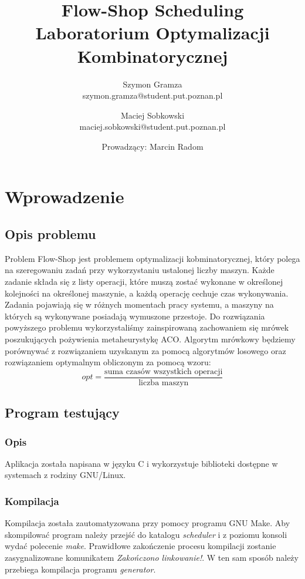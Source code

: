 \documentclass[10pt,a4paper]{article}
\title{Flow-Shop Scheduling\\Laboratorium Optymalizacji Kombinatorycznej}
\author{Szymon Gramza\\
  szymon.gramza@student.put.poznan.pl
\and
  Maciej Sobkowski\\
  maciej.sobkowski@student.put.poznan.pl
\and
  Prowadzący: Marcin Radom
}
\begin{document}
\maketitle
\section{Wprowadzenie}
\subsection{Opis problemu}
Problem Flow-Shop jest problemem optymalizacji kobminatorycznej, który polega na
szeregowaniu zadań przy wykorzystaniu ustalonej liczby maszyn. Każde zadanie
składa się z listy operacji, które muszą zostać wykonane w określonej kolejności
na określonej maszynie, a każdą operację cechuje czas wykonywania. Zadania
pojawiają się w różnych momentach pracy systemu, a maszyny na których są
wykonywane posiadają wymuszone przestoje.  Do rozwiązania powyższego problemu
wykorzystaliśmy zainspirowaną zachowaniem się mrówek poszukujących pożywienia
metaheurystykę ACO\@. Algorytm mrówkowy będziemy porównywać z rozwiązaniem
uzyskanym za pomocą algorytmów losowego oraz rozwiązaniem optymalnym obliczonym
za pomocą wzoru: 
\[ opt = \frac{\text{suma\ czasów\ wszystkich
operacji}}{\text{liczba\ maszyn}} \]

\subsection{Program testujący}

\subsubsection{Opis}
Aplikacja została napisana w języku C i wykorzystuje biblioteki dostępne w
systemach z rodziny GNU/Linux. 

\subsubsection{Kompilacja}
Kompilacja została zautomatyzowana przy pomocy programu GNU Make. Aby
skompilować program należy przejść do katalogu \textit{scheduler} i z poziomu 
konsoli wydać polecenie \textit{make}. Prawidłowe zakończenie procesu kompilacji 
zostanie zasygnalizowane komunikatem \textit{Zakończono linkowanie!}. W ten sam
sposób należy przebiega kompilacja programu \textit{generator}.
\end{document}
